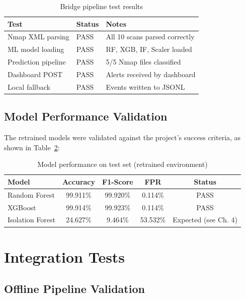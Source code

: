\begin{table}[H]
\centering
\caption{Bridge pipeline test results}
\label{tab:unit_tests}
\begin{tabular}{lll}
\toprule
\textbf{Test} & \textbf{Status} & \textbf{Notes} \\
\midrule
Nmap XML parsing & PASS & All 10 scans parsed correctly \\
ML model loading & PASS & RF, XGB, IF, Scaler loaded \\
Prediction pipeline & PASS & 5/5 Nmap files classified \\
Dashboard POST & PASS & Alerts received by dashboard \\
Local fallback & PASS & Events written to JSONL \\
\bottomrule
\end{tabular}
\end{table}

\subsection{Model Performance Validation}

The retrained models were validated against the project's success criteria, as shown in Table~\ref{tab:model_validation}:

\begin{table}[H]
\centering
\caption{Model performance on test set (retrained environment)}
\label{tab:model_validation}
\begin{tabular}{lcccc}
\toprule
\textbf{Model} & \textbf{Accuracy} & \textbf{F1-Score} & \textbf{FPR} & \textbf{Status} \\
\midrule
Random Forest & 99.911\% & 99.920\% & 0.114\% & PASS \\
XGBoost & 99.914\% & 99.923\% & 0.114\% & PASS \\
Isolation Forest & 24.627\% & 9.464\% & 53.532\% & Expected (see Ch. 4) \\
\bottomrule
\end{tabular}
\end{table}

\section{Integration Tests}

\subsection{Offline Pipeline Validation}

